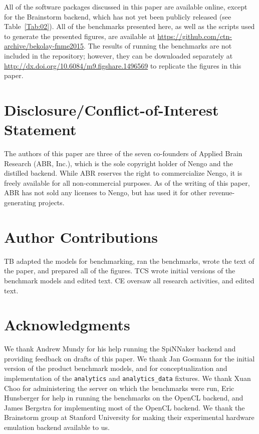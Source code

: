 \documentclass{frontiersSCNS}
\begin{document}
All of the software packages discussed in this paper
are available online,
except for the Brainstorm backend,
which has not yet been publicly released
(see Table~\ref{Tab:02}).
All of the benchmarks presented here,
as well as the scripts used to generate
the presented figures,
are available at
\url{https://github.com/ctn-archive/bekolay-fnme2015}.
The results of running the benchmarks
are not included in the repository;
however, they can be downloaded separately at
\url{http://dx.doi.org/10.6084/m9.figshare.1496569}
to replicate the figures in this paper.

\section*{Disclosure/Conflict-of-Interest Statement}

The authors of this paper
are three of the seven co-founders
of Applied Brain Research (ABR, Inc.),
which is the sole copyright holder
of Nengo and the distilled backend.
While ABR reserves the right
to commercialize Nengo,
it is freely available
for all non-commercial purposes.
As of the writing of this paper,
ABR has not sold any licenses to Nengo,
but has used it
for other revenue-generating projects.

\section*{Author Contributions}

TB adapted the models for benchmarking,
ran the benchmarks,
wrote the text of the paper,
and prepared all of the figures.
TCS wrote initial versions of the benchmark models
and edited text.
CE oversaw all research activities,
and edited text.

\section*{Acknowledgments}

We thank Andrew Mundy for his help
running the SpiNNaker backend
and providing feedback on drafts of this paper.
We thank Jan Gosmann for the initial version
of the product benchmark models,
and for conceptualization and implementation
of the \texttt{analytics} and \texttt{analytics\_data}
fixtures.
We thank Xuan Choo for administering
the server on which the benchmarks were run,
Eric Hunsberger for help in running
the benchmarks on the OpenCL backend,
and James Bergstra for
implementing most of the OpenCL backend.
We thank the Brainstorm group
at Stanford University for making
their experimental hardware emulation backend
available to us.
\end{document}
